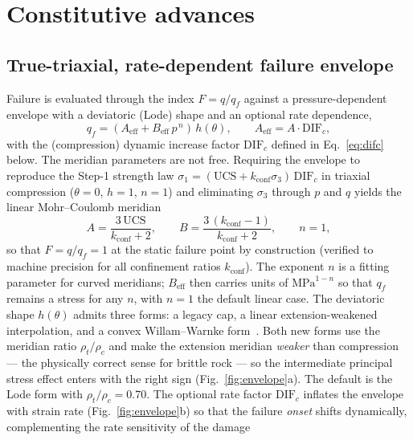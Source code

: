\documentclass[sn-basic]{sn-jnl}
\begin{document}
\section{Constitutive advances}\label{sec:advances}

\subsection{True-triaxial, rate-dependent failure envelope}\label{sec:env}

Failure is evaluated through the index $F=q/q_f$ against a pressure-dependent
envelope with a deviatoric (Lode) shape and an optional rate dependence,
\begin{equation}
q_f=(A_{\mathrm{eff}}+B_{\mathrm{eff}}\,p^{\,n})\,h(\theta),\qquad
A_{\mathrm{eff}}=A\cdot\mathrm{DIF}_c,
\label{eq:qf}
\end{equation}
with the (compression) dynamic increase factor $\mathrm{DIF}_c$ defined in
Eq.~\eqref{eq:difc} below.
The meridian parameters are not free. Requiring the envelope to reproduce the
Step-1 strength law $\sigma_1=(\mathrm{UCS}+k_{\mathrm{conf}}\sigma_3)\,\mathrm{DIF}_c$
in triaxial compression ($\theta=0$, $h=1$, $n=1$) and eliminating $\sigma_3$
through $p$ and $q$ yields the linear Mohr--Coulomb meridian
\begin{equation}
A=\frac{3\,\mathrm{UCS}}{k_{\mathrm{conf}}+2},\qquad
B=\frac{3\,(k_{\mathrm{conf}}-1)}{k_{\mathrm{conf}}+2},\qquad n=1,
\label{eq:AB}
\end{equation}
so that $F=q/q_f=1$ at the static failure point by construction (verified to
machine precision for all confinement ratios $k_{\mathrm{conf}}$). The exponent
$n$ is a fitting parameter for curved meridians; $B_{\mathrm{eff}}$ then carries
units of $\mathrm{MPa}^{1-n}$ so that $q_f$ remains a stress for any $n$, with
$n=1$ the default linear case. The deviatoric shape $h(\theta)$ admits three forms: a legacy cap, a
linear extension-weakened interpolation, and a convex Willam--Warnke
form~\citep{willam1975}. Both new forms use the meridian ratio $\rho_t/\rho_c$
and make the extension meridian \emph{weaker} than compression --- the physically
correct sense for brittle rock --- so the intermediate principal stress effect
enters with the right sign (Fig.~\ref{fig:envelope}a). The default is the Lode
form with $\rho_t/\rho_c=0.70$. The optional rate factor $\mathrm{DIF}_c$ inflates
the envelope with strain rate (Fig.~\ref{fig:envelope}b) so that the failure
\emph{onset} shifts dynamically, complementing the rate sensitivity of the damage
\end{document}
